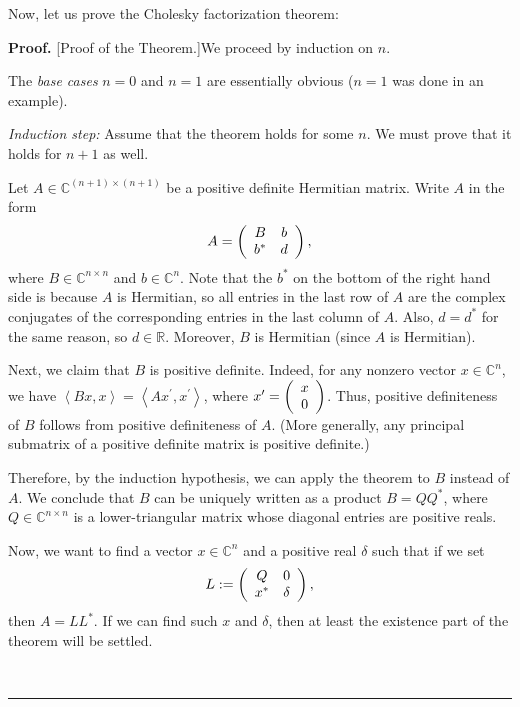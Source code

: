 \documentclass[numbers=enddot,12pt,final,onecolumn,notitlepage]{scrartcl}%
\numberwithin{exer}{subsection}
\theoremstyle{definition}
\newenvironment{proof}[1][Proof]{\noindent\textbf{#1.} }{\ \rule{0.5em}{0.5em}}
\begin{document}
Now, let us prove the Cholesky factorization theorem:

\begin{proof}
[Proof of the Theorem.]We proceed by induction on $n$.

The \textit{base cases} $n=0$ and $n=1$ are essentially obvious ($n=1$ was
done in an example).

\textit{Induction step:} Assume that the theorem holds for some $n$. We must
prove that it holds for $n+1$ as well.

Let $A\in\mathbb{C}^{\left(  n+1\right)  \times\left(  n+1\right)  }$ be a
positive definite Hermitian matrix. Write $A$ in the form%
\[
A=\left(
\begin{array}
[c]{cc}%
B & b\\
b^{\ast} & d
\end{array}
\right)  ,
\]
where $B\in\mathbb{C}^{n\times n}$ and $b\in\mathbb{C}^{n}$. Note that the
$b^{\ast}$ on the bottom of the right hand side is because $A$ is Hermitian,
so all entries in the last row of $A$ are the complex conjugates of the
corresponding entries in the last column of $A$. Also, $d=d^{\ast}$ for the
same reason, so $d\in\mathbb{R}$. Moreover, $B$ is Hermitian (since $A$ is Hermitian).

Next, we claim that $B$ is positive definite. Indeed, for any nonzero vector
$x\in\mathbb{C}^{n}$, we have $\left\langle Bx,x\right\rangle =\left\langle
Ax^{\prime},x^{\prime}\right\rangle $, where $x^{\prime}=\left(
\begin{array}
[c]{c}%
x\\
0
\end{array}
\right)  $. Thus, positive definiteness of $B$ follows from positive
definiteness of $A$. (More generally, any principal submatrix of a positive
definite matrix is positive definite.)

Therefore, by the induction hypothesis, we can apply the theorem to $B$
instead of $A$. We conclude that $B$ can be uniquely written as a product
$B=QQ^{\ast}$, where $Q\in\mathbb{C}^{n\times n}$ is a lower-triangular matrix
whose diagonal entries are positive reals.

Now, we want to find a vector $x\in\mathbb{C}^{n}$ and a positive real
$\delta$ such that if we set%
\[
L:=\left(
\begin{array}
[c]{cc}%
Q & 0\\
x^{\ast} & \delta
\end{array}
\right)  ,
\]
then $A=LL^{\ast}$. If we can find such $x$ and $\delta$, then at least the
existence part of the theorem will be settled.


\end{proof}
\end{document}
